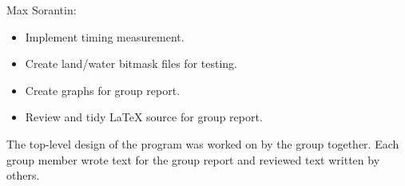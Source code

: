 Max Sorantin:
\begin{itemize}
	\item Implement timing measurement.
	\item Create land/water bitmask files for testing.
	\item Create graphs for group report.
	\item Review and tidy LaTeX source for group report.
\end{itemize}

The top-level design of the program was worked on by the group together.  Each group member wrote text for the group report and reviewed text written by others.
